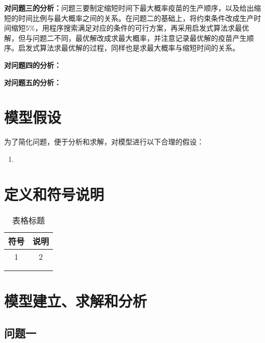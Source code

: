 \documentclass[UTF8]{ctexart}
\begin{document}
	\textbf{对问题三的分析：}问题三要制定缩短时间下最大概率疫苗的生产顺序，以及给出缩短的时间比例与最大概率之间的关系。在问题二的基础上，将约束条件改成生产时间缩短5\%，用程序搜索满足对应的条件的可行方案，再采用启发式算法求最优解，但与问题二不同，最优解改成求最大概率，并注意记录最优解的疫苗产生顺序。启发式算法求最优解的过程，同样也是求最大概率与缩短时间的关系。
	
	\textbf{对问题四的分析：}
	
	
	\textbf{对问题五的分析：}
	
	
	\section{模型假设}
	为了简化问题，便于分析和求解，对模型进行以下合理的假设：
	\begin{enumerate}
		\item
	\end{enumerate}
	
	\section{定义和符号说明}
	\begin{table}[htbp]
		\centering
		\begin{tabular}{ c c }
			\toprule[2pt]
			符号 & 说明   \\
			\hline
			1 & 2  \\
			  &   \\
			  &   \\
			\bottomrule[2pt]
		\end{tabular}\caption{表格标题}\label{p1}
	\end{table}
	
	
	
	\section{模型建立、求解和分析}
	\subsection{问题一}
\end{document}
